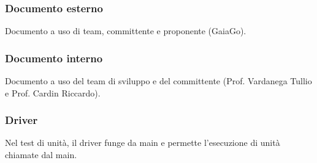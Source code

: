 \subsubsection*{Documento esterno}
Documento a uso di team, committente e proponente (GaiaGo).

\subsubsection*{Documento interno}
Documento a uso del team di sviluppo e del committente (Prof. Vardanega Tullio e Prof. Cardin Riccardo).

\subsubsection*{Driver }
Nel test di unità, il driver funge da main e permette l'esecuzione di unità chiamate dal main.

